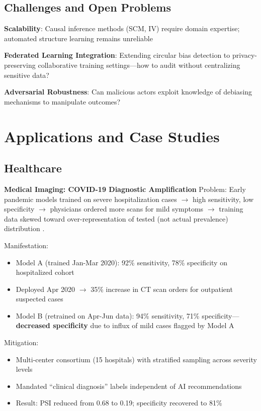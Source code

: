 \documentclass[11pt,a4paper]{article}
\begin{document}
\subsection{Challenges and Open Problems}

\textbf{Scalability}: Causal inference methods (SCM, IV) require domain expertise; automated structure learning remains unreliable

\textbf{Federated Learning Integration}: Extending circular bias detection to privacy-preserving collaborative training settings—how to audit without centralizing sensitive data?

\textbf{Adversarial Robustness}: Can malicious actors exploit knowledge of debiasing mechanisms to manipulate outcomes?

\section{Applications and Case Studies}

\subsection{Healthcare}

\textbf{Medical Imaging: COVID-19 Diagnostic Amplification}  
Problem: Early pandemic models trained on severe hospitalization cases $\rightarrow$ high sensitivity, low specificity $\rightarrow$ physicians ordered more scans for mild symptoms $\rightarrow$ training data skewed toward over-representation of tested (not actual prevalence) distribution \cite{varoquaux2022}.

Manifestation:  
\begin{itemize}
    \item Model A (trained Jan-Mar 2020): 92\% sensitivity, 78\% specificity on hospitalized cohort  
    \item Deployed Apr 2020 $\rightarrow$ 35\% increase in CT scan orders for outpatient suspected cases  
    \item Model B (retrained on Apr-Jun data): 94\% sensitivity, 71\% specificity—\textbf{decreased specificity} due to influx of mild cases flagged by Model A
\end{itemize}

Mitigation:  
\begin{itemize}
    \item Multi-center consortium (15 hospitals) with stratified sampling across severity levels  
    \item Mandated ``clinical diagnosis'' labels independent of AI recommendations  
    \item Result: PSI reduced from 0.68 to 0.19; specificity recovered to 81\%
\end{itemize}
\end{document}
